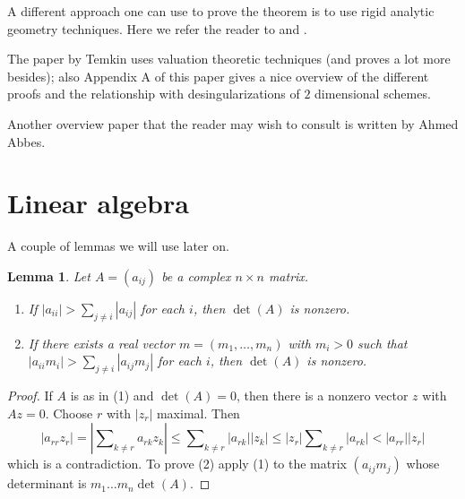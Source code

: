 \documentclass{stacks-project}
\newenvironment{reference}{\comment}{\endcomment}
\theoremstyle{plain}
\newtheorem{lemma}[subsection]{Lemma}
\theoremstyle{definition}
\theoremstyle{remark}
\numberwithin{equation}{subsection}
\begin{document}
\medskip\noindent
A different approach one can use to prove the theorem is to use
rigid analytic geometry techniques. Here we refer the reader to
\cite{vanderPut} and \cite{Arzdorf-Wewers}.

\medskip\noindent
The paper \cite{Temkin} by Temkin uses valuation theoretic techniques
(and proves a lot more besides); also Appendix A of this paper gives
a nice overview of the different proofs and the relationship with
desingularizations of $2$ dimensional schemes.

\medskip\noindent
Another overview paper that the reader may wish to consult is
\cite{Abbes-ssr} written by Ahmed Abbes.






\section{Linear algebra}
\label{section-linear-algebra}

\noindent
A couple of lemmas we will use later on.

\begin{lemma}
\label{lemma-recurring}
\begin{reference}
\cite[Theorem I]{Taussky}
\end{reference}
Let $A = (a_{ij})$ be a complex $n \times n$ matrix.
\begin{enumerate}
\item If $|a_{ii}| > \sum_{j \not = i} |a_{ij}|$ for each $i$, then
$\det(A)$ is nonzero.
\item If there exists a real vector $m = (m_1, \ldots, m_n)$
with $m_i > 0$ such that $|a_{ii} m_i| > \sum_{j \not = i} |a_{ij}m_j|$
for each $i$, then $\det(A)$ is nonzero.
\end{enumerate}
\end{lemma}

\begin{proof}
If $A$ is as in (1) and $\det(A) = 0$, then there is a nonzero vector
$z$ with $Az = 0$. Choose $r$ with $|z_r|$ maximal. Then
$$
|a_{rr} z_r| = |\sum\nolimits_{k \not = r} a_{rk}z_k| \leq
\sum\nolimits_{k \not = r} |a_{rk}||z_k| \leq
|z_r| \sum\nolimits_{k \not = r} |a_{rk}| < |a_{rr}||z_r|
$$
which is a contradiction. To prove (2) apply (1) to the matrix
$(a_{ij}m_j)$ whose determinant is $m_1 \ldots m_n \det(A)$.
\end{proof}
\end{document}
